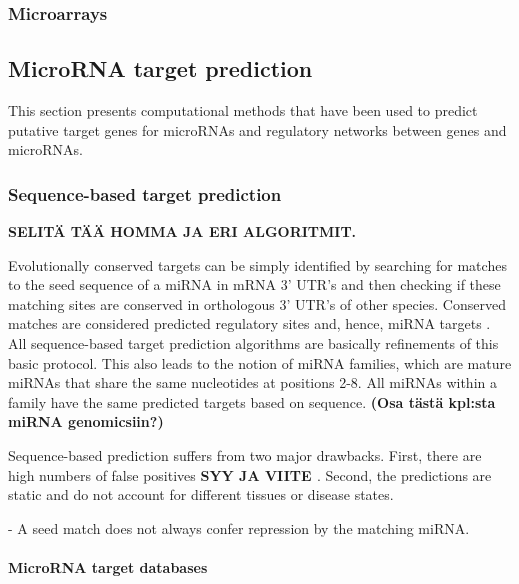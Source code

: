\subsubsection{Microarrays}







\subsection{MicroRNA target prediction}\label{mirna-target-prediction}

This section presents computational methods that have been used to predict
putative target genes for microRNAs and regulatory networks between genes and
microRNAs.





\subsubsection{Sequence-based target prediction}\label{sequence-based-target-
prediction}

\textbf{SELITÄ TÄÄ HOMMA JA ERI ALGORITMIT.}

Evolutionally conserved targets can be simply identified by searching for
matches to the seed sequence of a miRNA in mRNA 3' UTR's and then checking if
these matching sites are conserved in orthologous 3' UTR's of other species.
Conserved matches are considered predicted regulatory sites and, hence, miRNA
targets \citep{Bartel2009}. All sequence-based target prediction algorithms are basically
refinements of this basic protocol. This also leads to the notion of miRNA
families, which are mature miRNAs that share the same nucleotides at positions
2-8. All miRNAs within a family have the same predicted targets based on sequence.
\textbf{(Osa tästä kpl:sta miRNA genomicsiin?)}

Sequence-based prediction suffers from two major drawbacks. First, there are
high numbers of false positives \textbf{SYY JA VIITE
\citep{Sethupathy2006?}}. Second, the predictions are static and do not
account for different tissues or disease states.

- A seed match does not always confer repression by the matching miRNA.\citep{Grimson2007} %


\paragraph{MicroRNA target databases}





